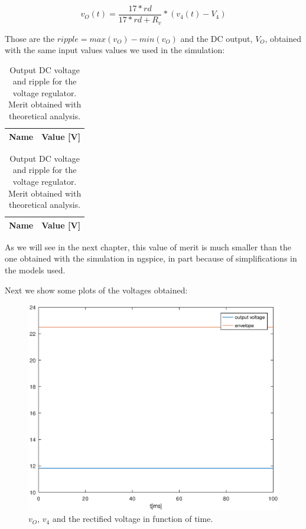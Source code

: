  \begin{equation}
 v_O(t)=\frac{17*rd}{17*rd+R_v}*(v_4(t)-V_4)
  \label{eq:reg}
\end{equation}

\par Those are the $ripple=max(v_O)-min(v_O)$ and the DC output, $V_O$, obtained with the same input values values we used in the simulation:

\begin{table}[htb!]
  \centering
  \begin{tabular}{|l|r|}
      \hline    
      {\bf Name} & {\bf Value [V]} \\ \hline
      
  \end{tabular}
\quad
  \begin{tabular}{|l|r|}
    \hline    
    {\bf Name} & {\bf Value [V]} \\ \hline
    
  \end{tabular}
     \caption{Output DC voltage and ripple for the voltage regulator. Merit obtained with theoretical analysis.}
  \label{tab:reg}
\end{table}


\par As we will see in the next chapter, this value of merit is much smaller than the one obtained with the simulation in ngspice, in part because of simplifications in the models used.

\par Next we show some plots of the voltages obtained:

 \begin{figure}[H] \centering
\includegraphics[width=0.8 \linewidth]{vregulator.eps}
\caption{$v_O$, $v_4$ and the rectified voltage in function of time.}
\label{fig:env}
\end{figure}


